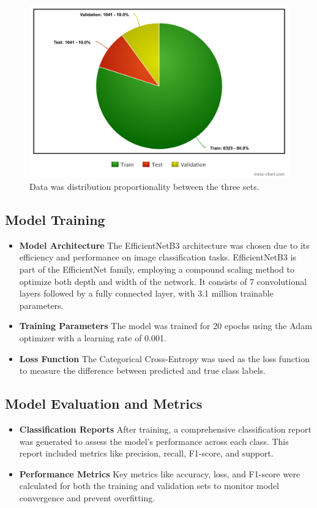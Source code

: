 \documentclass[conference]{IEEEtran}
\begin{document}
\begin{figure}[H]
    \centerline{\includegraphics[width=\linewidth]{fig3.png}}
    \caption{Data was distribution proportionality between the three sets.}
    \label{fig3}
\end{figure}

\subsection{Model Training}
\begin{itemize}
    \item \textbf{Model Architecture} The EfficientNetB3 architecture was chosen due to its efficiency and performance on image classification tasks. EfficientNetB3 is part of the EfficientNet family, employing a compound scaling method to optimize both depth and width of the network. It consists of 7 convolutional layers followed by a fully connected layer, with 3.1 million trainable parameters.
    \item \textbf{Training Parameters} The model was trained for 20 epochs using the Adam optimizer with a learning rate of 0.001.
    \item \textbf{Loss Function} The Categorical Cross-Entropy was used as the loss function to measure the difference between predicted and true class labels.
\end{itemize}

\subsection{Model Evaluation and Metrics}
\begin{itemize}
    \item \textbf{Classification Reports} After training, a comprehensive classification report was generated to assess the model's performance across each class. This report included metrics like precision, recall, F1-score, and support.
    \item \textbf{Performance Metrics} Key metrics like accuracy, loss, and F1-score were calculated for both the training and validation sets to monitor model convergence and prevent overfitting.
\end{itemize}
\end{document}
